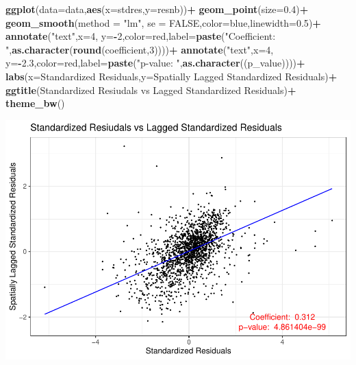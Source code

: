 \documentclass[
]{article}
\newenvironment{Shaded}{\begin{snugshade}}{\end{snugshade}}
\newcommand{\AttributeTok}[1]{\textcolor[rgb]{0.13,0.29,0.53}{#1}}
\newcommand{\ConstantTok}[1]{\textcolor[rgb]{0.56,0.35,0.01}{#1}}
\newcommand{\DecValTok}[1]{\textcolor[rgb]{0.00,0.00,0.81}{#1}}
\newcommand{\FloatTok}[1]{\textcolor[rgb]{0.00,0.00,0.81}{#1}}
\newcommand{\FunctionTok}[1]{\textcolor[rgb]{0.13,0.29,0.53}{\textbf{#1}}}
\newcommand{\NormalTok}[1]{#1}
\newcommand{\SpecialCharTok}[1]{\textcolor[rgb]{0.81,0.36,0.00}{\textbf{#1}}}
\newcommand{\StringTok}[1]{\textcolor[rgb]{0.31,0.60,0.02}{#1}}
\begin{document}
\begin{Shaded}
\begin{Highlighting}[]
\FunctionTok{ggplot}\NormalTok{(}\AttributeTok{data=}\NormalTok{data,}\FunctionTok{aes}\NormalTok{(}\AttributeTok{x=}\NormalTok{stdres,}\AttributeTok{y=}\NormalTok{resnb))}\SpecialCharTok{+}
  \FunctionTok{geom\_point}\NormalTok{(}\AttributeTok{size=}\FloatTok{0.4}\NormalTok{)}\SpecialCharTok{+}
  \FunctionTok{geom\_smooth}\NormalTok{(}\AttributeTok{method =} \StringTok{"lm"}\NormalTok{, }\AttributeTok{se =} \ConstantTok{FALSE}\NormalTok{,}\AttributeTok{color=}\StringTok{\textquotesingle{}blue\textquotesingle{}}\NormalTok{,}\AttributeTok{linewidth=}\FloatTok{0.5}\NormalTok{)}\SpecialCharTok{+}
  \FunctionTok{annotate}\NormalTok{(}\StringTok{"text"}\NormalTok{,}\AttributeTok{x=}\DecValTok{4}\NormalTok{, }\AttributeTok{y=}\SpecialCharTok{{-}}\DecValTok{2}\NormalTok{,}\AttributeTok{color=}\StringTok{\textquotesingle{}red\textquotesingle{}}\NormalTok{,}\AttributeTok{label=}\FunctionTok{paste}\NormalTok{(}\StringTok{"Coefficient: "}\NormalTok{,}\FunctionTok{as.character}\NormalTok{(}\FunctionTok{round}\NormalTok{(coefficient,}\DecValTok{3}\NormalTok{))))}\SpecialCharTok{+}
  \FunctionTok{annotate}\NormalTok{(}\StringTok{"text"}\NormalTok{,}\AttributeTok{x=}\DecValTok{4}\NormalTok{, }\AttributeTok{y=}\SpecialCharTok{{-}}\FloatTok{2.3}\NormalTok{,}\AttributeTok{color=}\StringTok{\textquotesingle{}red\textquotesingle{}}\NormalTok{,}\AttributeTok{label=}\FunctionTok{paste}\NormalTok{(}\StringTok{"p{-}value: "}\NormalTok{,}\FunctionTok{as.character}\NormalTok{((p\_value))))}\SpecialCharTok{+}
  \FunctionTok{labs}\NormalTok{(}\AttributeTok{x=}\StringTok{\textquotesingle{}Standardized Residuals\textquotesingle{}}\NormalTok{,}\AttributeTok{y=}\StringTok{\textquotesingle{}Spatially Lagged Standardized Residuals\textquotesingle{}}\NormalTok{)}\SpecialCharTok{+}
  \FunctionTok{ggtitle}\NormalTok{(}\StringTok{\textquotesingle{}Standardized Resiudals vs Lagged Standardized Residuals\textquotesingle{}}\NormalTok{)}\SpecialCharTok{+}
  \FunctionTok{theme\_bw}\NormalTok{()}
\end{Highlighting}
\end{Shaded}

\includegraphics{HW2-SpatialRegression_files/figure-latex/unnamed-chunk-2-1.pdf}
\end{document}
